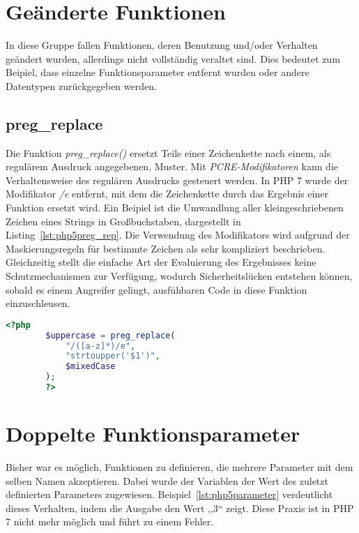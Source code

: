 \section{Geänderte Funktionen}
In diese Gruppe fallen Funktionen, deren Benutzung und/oder Verhalten geändert wurden, allerdings nicht vollständig veraltet sind. Dies bedeutet zum Beipiel, dass 
einzelne Funktionsparameter entfernt wurden oder andere Datentypen zurückgegeben werden.
    \subsection{preg\_replace} \label{preg_replace}
    Die Funktion \textit{preg\_replace()} ersetzt Teile einer Zeichenkette nach einem, als regulärem Ausdruck angegebenen, Muster. Mit \textit{\acs{PCRE}-Modifikatoren} 
    kann die Verhaltensweise des regulären Ausdrucks gesteuert werden. In \acs{PHP} 7 wurde der Modifikator \textit{/e} entfernt, mit dem die Zeichenkette durch das Ergebnis
    einer Funktion ersetzt wird. Ein Beipiel ist die Umwandlung aller kleingeschriebenen Zeichen eines Strings in Großbuchstaben, dargestellt in Listing~\ref{lst:php5preg_rep}. Die Verwendung
    des Modifikators wird aufgrund der Maskierungsregeln für bestimmte Zeichen als sehr kompliziert beschrieben. Gleichzeitig stellt die einfache Art der Evaluierung
    des Ergebnisses keine Schutzmechanismen zur Verfügung, wodurch Sicherheitslücken entstehen können, sobald es einem Angreifer gelingt, ausfühbaren Code in diese
    Funktion einzuschleusen. 

    \begin{lstlisting}[language=php, caption={Beispiel der Nutzung von preg\_replace mit dem Modifikator /e}, label={lst:php5preg_rep}]
        <?php
        $uppercase = preg_replace(
            "/([a-z]*)/e",
            "strtoupper('$1')",
            $mixedCase
        );
        ?>
    \end{lstlisting}
    
    \section{Doppelte Funktionsparameter}\label{php5double}
    Bisher war es möglich, Funktionen zu definieren, die mehrere Parameter mit dem selben Namen akzeptieren. Dabei wurde der 
    Variablen der Wert des zuletzt definierten Parameters zugewiesen. Beispiel~\ref{lst:php5parameter} verdeutlicht dieses 
    Verhalten, indem die Ausgabe den Wert ,,3`` zeigt. Diese Praxis ist in \ac{PHP} 7 nicht mehr möglich und 
    führt zu einem Fehler.

